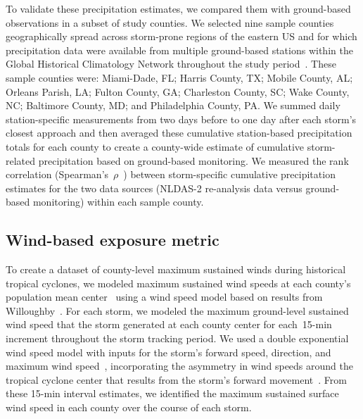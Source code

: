 To validate these precipitation estimates, we compared them with ground-based
observations in a subset of study counties. We selected nine sample counties
geographically spread across storm-prone regions of the eastern \ac{US} and for
which precipitation data were available from multiple ground-based stations
within the Global Historical Climatology Network throughout the study
period~\parencite{menne2012overview, rnoaa, countyweather}. These sample
counties were: Miami-Dade, FL; Harris County, TX; Mobile County, AL; Orleans
Parish, LA; Fulton County, GA; Charleston County, SC; Wake County, NC;
Baltimore County, MD; and Philadelphia County, PA. We summed daily
station-specific measurements from two days before to one day after each
storm's closest approach and then averaged these cumulative station-based
precipitation totals for each county to create a county-wide estimate of
cumulative storm-related precipitation based on ground-based monitoring. We
measured the rank correlation (Spearman's~$\rho$~\parencite{spearman1904proof})
between storm-specific cumulative precipitation estimates for the two data
sources (\ac{NLDAS-2} re-analysis data versus ground-based monitoring) within
each sample county.

\subsection*{Wind-based exposure metric}

To create a dataset of county-level maximum sustained winds during historical
tropical cyclones, we modeled maximum sustained wind speeds at each county's
population mean center~\parencite{countycenters} using a wind speed model based
on results from Willoughby~\parencite{willoughby2006parametric}. For each
storm, we modeled the maximum ground-level sustained wind speed that the storm
generated at each county center for each~15-\si{\minute} increment throughout
the storm tracking period. We used a double exponential wind speed model with
inputs for the storm's forward speed, direction, and maximum wind
speed~\parencite{willoughby2006parametric, stormwindmodel}, incorporating the
asymmetry in wind speeds around the tropical cyclone center that results from
the storm's forward movement~\parencite{phadke2003modeling}. From these
15-\si{\minute} interval estimates, we identified the maximum sustained surface
wind speed in each county over the course of each storm.

